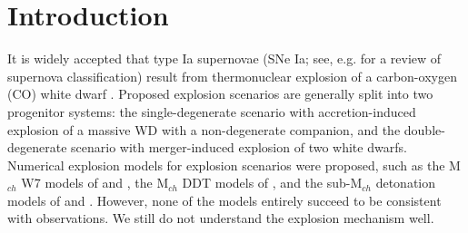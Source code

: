 \documentclass[twocolumn]{aastex631}
\begin{document}

\section{Introduction} \label{sec:intro}

It is widely accepted that type Ia supernovae (SNe Ia; see, e.g. \citealt{1997ARAA..35..309F} for a review of supernova classification) result from thermonuclear explosion of a carbon-oxygen (CO) white dwarf \citep{1997Sci...276.1378N,2000ARAA..38..191H,2014ARAA..52..107M}. Proposed explosion scenarios are generally split into two progenitor systems: the single-degenerate scenario \citep{1973ApJ...186.1007W} with accretion-induced explosion of a massive WD with a non-degenerate companion, and the double-degenerate \citep{1984ApJS...54..335I,1984ApJ...277..355W} scenario with merger-induced explosion of two white dwarfs. Numerical explosion models for explosion scenarios were proposed, such as the M$_{ch}$ W7 models of \citet{1997NuPhA.621..467N} and \citet{1999ApJS..125..439I}, the M$_{ch}$ DDT models of \citet{2013MNRAS.429.1156S}, and the sub-M$_{ch}$ detonation models of \citet{2010ApJ...714L..52S} and \citet{2018ApJ...854...52S}. However, none of the models entirely succeed to be consistent with observations. We still do not understand the explosion mechanism well.
\end{document}

